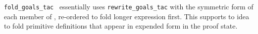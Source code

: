 \begin{isabellebody}
\begin{isamarkuptext}
\begin{description}
  \item \verb|fold_goals_tac|~ essentially uses \verb|rewrite_goals_tac| with the symmetric form of each member of , re-ordered to fold longer expression first.  This supports
  to idea to fold primitive definitions that appear in expended form
  in the proof state.

  \end{description}%
\end{isamarkuptext}%
\isamarkuptrue%
%
\endisatagmlref
{\isafoldmlref}%
%
\isadelimmlref
%
\endisadelimmlref
%
\isadelimtheory
%
\endisadelimtheory
%
\isatagtheory
{}\isamarkupfalse%
%
\endisatagtheory
{\isafoldtheory}%
%
\isadelimtheory
%
\endisadelimtheory
\isanewline
\end{isabellebody}%
